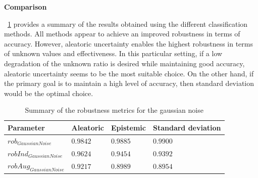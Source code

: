 \vspace{0.3cm}
\textbf{Comparison}
\vspace{0.1cm}

\Tab~\ref{table:rob_gn} provides a summary of the results obtained using the different classification methods. All methods appear to achieve an improved robustness in terms of accuracy. However, aleatoric uncertainty enables the highest robustness in terms of unknown values and effectiveness. In this particular setting, if a low degradation of the unknown ratio is desired while maintaining good accuracy, aleatoric uncertainty seems to be the most suitable choice. On the other hand, if the primary goal is to maintain a high level of accuracy, then standard deviation would be the optimal choice.

\begin{table}[h]
	\centering
	\begin{tabular}{|| l | l | l | l ||} 
		\hline
		\textbf{Parameter} & \textbf{Aleatoric} & \textbf{Epistemic} & \textbf{Standard deviation} \\
		\hline
		\hline
		$rob_{GaussianNoise}$ & $0.9842$ & $0.9885$ & $0.9900$ \\
		$robInd_{GaussianNoise}$ & $0.9624$ & $0.9454$ & $0.9392$ \\
		$robAug_{GaussianNoise}$ & $0.9217$ & $0.8989$ & $0.8954$ \\	
		\hline
	\end{tabular}	
	\caption{Summary of the robustness metrics for the gaussian noise}
	\label{table:rob_gn}
\end{table}